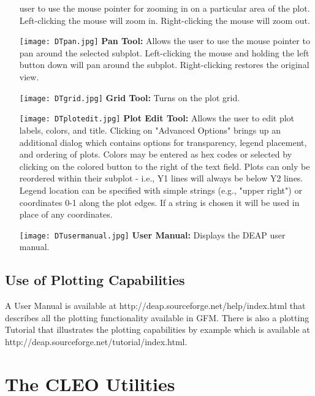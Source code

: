 \begin{itemize}
user to use the mouse pointer for zooming in on a particular area of the plot.
Left-clicking the mouse will zoom in. Right-clicking the mouse will zoom out.
\item[\texttt{[image: DTpan.jpg]}] {\bf Pan Tool:} Allows the user to use the mouse
pointer to pan around the selected subplot.  Left-clicking the mouse and holding the left
button down will pan around the subplot. Right-clicking restores the original view.
\item[\texttt{[image: DTgrid.jpg]}] {\bf Grid Tool:} Turns on the plot grid.
\item[\texttt{[image: DTplotedit.jpg]}] {\bf Plot Edit Tool:} Allows the user to edit
plot labels, colors, and title. Clicking on "Advanced Options" brings up an additional
dialog which contains options for transparency, legend placement, and ordering of plots.
Colors may be entered as hex codes or selected by clicking on the colored button to the
right of the text field. Plots can only be reordered within their subplot - i.e., Y1
lines will always be below Y2 lines. Legend location can be specified with simple
strings (e.g., "upper right") or coordinates 0-1 along the plot edges. If a string is
chosen it will be used in place of any coordinates.
\item[\texttt{[image: DTusermanual.jpg]}] {\bf User Manual:} Displays the DEAP user
manual.

\end{itemize}


\subsection{Use of Plotting Capabilities}

A User Manual is available at
{http://deap.sourceforge.net/help/index.html}
that describes all the plotting functionality available in \gls{GFM}. There is also a
plotting Tutorial that illustrates the plotting capabilities by example which is
available at
{http://deap.sourceforge.net/tutorial/index.html}.


\newpage

\section{The CLEO Utilities}\label{sec:cleo}

